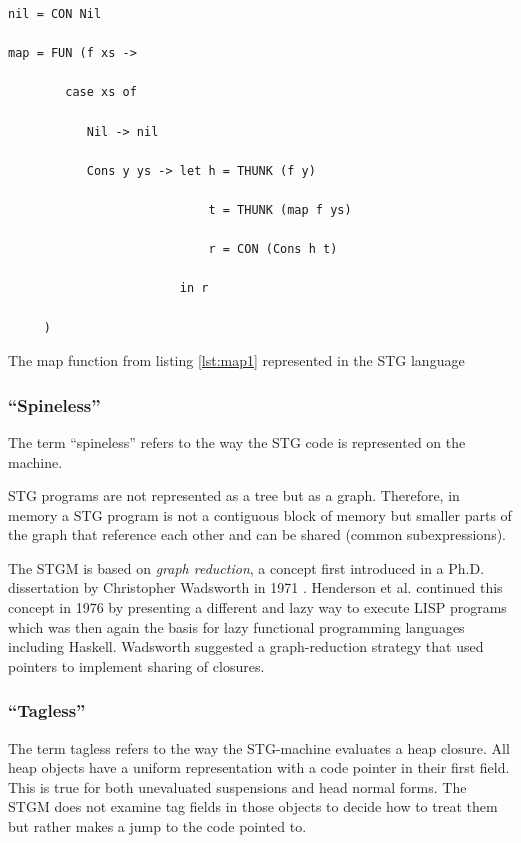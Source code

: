 \documentclass[runningheads]{llncs}
\begin{document}
\begin{listing}[H]
\begin{verbatim}
nil = CON Nil

map = FUN (f xs ->

        case xs of

           Nil -> nil

           Cons y ys -> let h = THUNK (f y)

                            t = THUNK (map f ys)

                            r = CON (Cons h t)

                        in r

     )
\end{verbatim}
\caption{The map function from listing \ref{lst:map1} represented in the STG language}
\label{lst:map2}
\end{listing}

\subsubsection{\enquote{Spineless}}
The term \enquote{spineless} refers to the way the STG code is represented on the machine. 

STG programs are not represented as a tree but as a graph. Therefore, in memory a STG program is not a contiguous block of memory but smaller parts of the graph that reference each other and can be shared (common subexpressions).

The STGM is based on \textit{graph reduction}, a concept first introduced in a Ph.D. dissertation by Christopher Wadsworth in 1971 \cite{christopherwadsworth}. Henderson et al. continued this concept in 1976 by presenting a different and lazy way to execute LISP programs \cite{henderson1976lazy} which was then again the basis for lazy functional programming languages including Haskell. Wadsworth suggested a graph-reduction strategy that used pointers to implement sharing of closures.

\subsubsection{\enquote{Tagless}}
The term tagless refers to the way the STG-machine evaluates a heap closure.
All heap objects have a uniform representation with a code pointer in their first field. This is true for both unevaluated suspensions and head normal forms. The STGM does not examine tag fields in those objects to decide how to treat them but rather makes a jump to the code pointed to. \cite{jones1992implementing}
\end{document}
